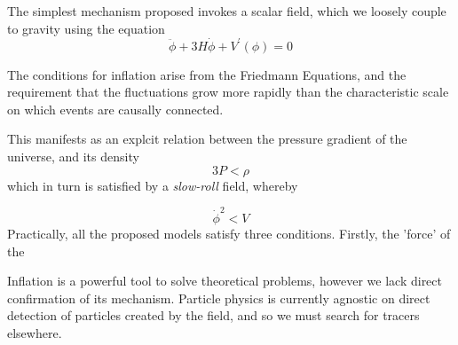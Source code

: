 The simplest mechanism proposed invokes a scalar field, which we loosely couple to gravity using the equation 
\begin{equation}\label{eq:sclr_inf}
\ddot{\phi} + 3 H \dot{\phi} + V^\prime(\phi) = 0
\end{equation}

The conditions for inflation arise from the Friedmann Equations, and the requirement that the fluctuations grow more rapidly than the characteristic scale on which events are causally connected. 

This manifests as an explcit relation between the pressure gradient of the universe, and its density
\begin{equation}\label{eq:inf_cndtn}
3 P < \rho
\end{equation}
which in turn is satisfied by a \emph{slow-roll} field, whereby 

\begin{equation}\label{eq:slw_rll}
\dot{\phi}^2 < V
\end{equation}
Practically, all the proposed models satisfy three conditions. Firstly, the 'force' of the 



Inflation is a powerful tool to solve theoretical problems, however we lack direct confirmation of its mechanism. Particle physics is currently agnostic on direct detection of particles created by the field, and so we must search for tracers elsewhere. 






